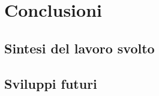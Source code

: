 \chapter*{Conclusioni}
\label{chap:conclusioni}

\section*{Sintesi del lavoro svolto}

\section*{Sviluppi futuri}
